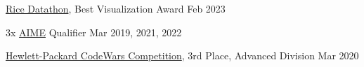\href{https://rice-datathon-2023.devpost.com/}{Rice Datathon}, Best Visualization Award \hfill Feb 2023 \par
3x \href{https://www.maa.org/math-competitions/american-invitational-mathematics-examination-aime}{AIME} Qualifier \hfill Mar 2019, 2021, 2022\par
\href{https://hpecodewars.org/api/Files/events/2020/2020WinnersHouston.pdf}{Hewlett-Packard CodeWars Competition}, 3rd Place, Advanced Division \hfill Mar 2020\par

